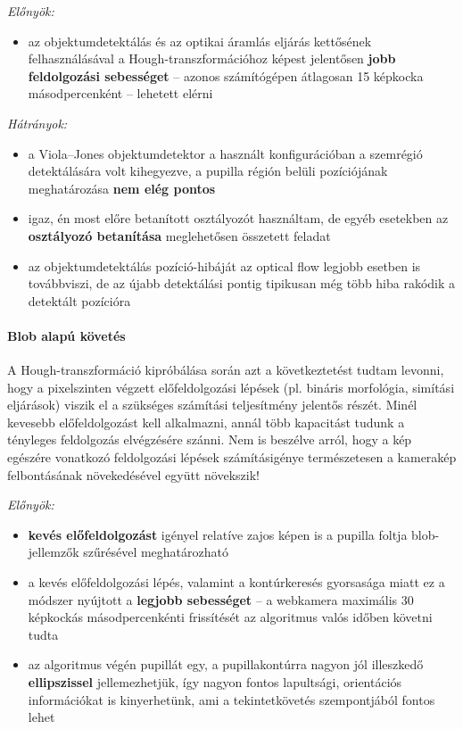 \emph{Előnyök:}

\begin{itemize}
  \item az objektumdetektálás és az optikai áramlás eljárás kettősének felhasználásával a Hough-transzformációhoz képest jelentősen \textbf{jobb feldolgozási sebességet} -- azonos számítógépen átlagosan 15 képkocka másodpercenként -- lehetett elérni
\end{itemize}

\emph{Hátrányok:}

\begin{itemize}
  \item a Viola--Jones objektumdetektor a használt konfigurációban a szemrégió detektálására volt kihegyezve, a pupilla régión belüli pozíciójának meghatározása \textbf{nem elég pontos}
  \item igaz, én most előre betanított osztályozót használtam, de egyéb esetekben az \textbf{osztályozó betanítása} meglehetősen összetett feladat
  \item az objektumdetektálás pozíció-hibáját az optical flow legjobb esetben is továbbviszi, de az újabb detektálási pontig tipikusan még több hiba rakódik a detektált pozícióra
\end{itemize}

\medskip
\paragraph{Blob alapú követés}

A Hough-transzformáció kipróbálása során azt a következtetést tudtam levonni, hogy a pixelszinten végzett előfeldolgozási lépések (pl. bináris morfológia, simítási eljárások) viszik el a szükséges számítási teljesítmény jelentős részét. Minél kevesebb előfeldolgozást kell alkalmazni, annál több kapacitást tudunk a tényleges feldolgozás elvégzésére szánni. Nem is beszélve arról, hogy a kép egészére vonatkozó feldolgozási lépések számításigénye természetesen a kamerakép felbontásának növekedésével együtt növekszik!

\medskip

\emph{Előnyök:}

\begin{itemize}
  \item \textbf{kevés előfeldolgozást} igényel relatíve zajos képen is a pupilla foltja blob-jellemzők szűrésével meghatározható
  \item a kevés előfeldolgozási lépés, valamint a kontúrkeresés gyorsasága miatt ez a módszer nyújtott a \textbf{legjobb sebességet} -- a webkamera maximális 30 képkockás másodpercenkénti frissítését az algoritmus valós időben követni tudta
  \item az algoritmus végén pupillát egy, a pupillakontúrra nagyon jól illeszkedő \textbf{ellipszissel} jellemezhetjük, így nagyon fontos lapultsági, orientációs információkat is kinyerhetünk, ami a tekintetkövetés szempontjából fontos lehet
\end{itemize}

